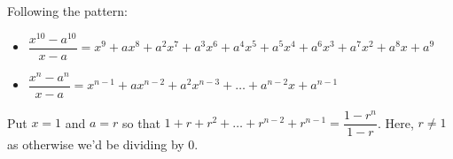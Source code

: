 \begin{exenum}
Following the pattern: 

\begin{itemize}

\item $\dfrac{x^{10} - a^{10}}{x-a} = x^{9} + ax^8 + a^2x^7+a^3x^6+a^4x^5+a^5x^4+a^6x^3+a^7x^2+a^8x+a^9$

\item  $\dfrac{x^{n} - a^{n}}{x-a} = x^{n-1} + ax^{n-2} + a^2x^{n-3} + \ldots + a^{n-2} x + a^{n-1}$

\end{itemize}

\item Put $x=1$ and $a = r$ so that  $1 + r + r^2 + \dots + r^{n-2} + r^{n-1} = \dfrac{1 - r^{n}}{1-r}$.  Here,   $r \neq 1$ as otherwise we'd be dividing by $0$.

\end{exenum}
